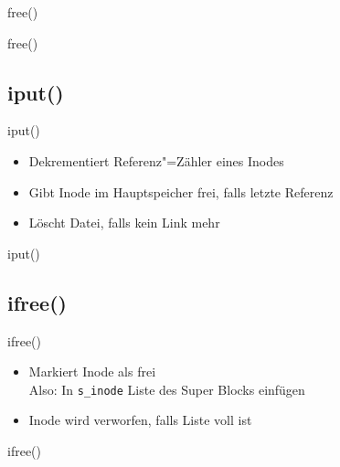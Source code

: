 \documentclass{beamer}
\begin{document}
\begin{frame}{free()}
\end{frame}

\begin{frame}{free()}
\end{frame}




\subsection{iput()}

\begin{frame}{iput()}
    \begin{itemize}
        \item Dekrementiert Referenz"=Zähler eines Inodes
        \item Gibt Inode im Hauptspeicher frei, falls letzte Referenz
        \item Löscht Datei, falls kein Link mehr
    \end{itemize}
\end{frame}

\begin{frame}{iput()}
\end{frame}




\subsection{ifree()}

\begin{frame}{ifree()}
    \begin{itemize}
        \item Markiert Inode als frei\\
            Also: In \texttt{s\_inode} Liste des Super Blocks einfügen
        \medskip
        \item Inode wird verworfen, falls Liste voll ist
    \end{itemize}
\end{frame}

\begin{frame}{ifree()}
\end{frame}
\end{document}
